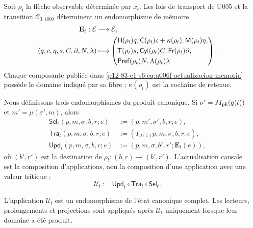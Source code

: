 {Soit \(\rho_t\) la flèche observable déterminée par \(x_t\). Les lois de
transport de U005 et la transition \(\mathcal C_{3,1000}\) déterminent un
endomorphisme de mémoire
\begin{align}
 \mathbf E_t:\mathcal E&\longrightarrow\mathcal E,\notag\\
 (q,c,\eta,s,C,\partial,N,\lambda)&\longmapsto
 \left(
 \begin{aligned}
 &\mathsf H(\rho_t)q,
  \mathsf C(\rho_t)c+\kappa(\rho_t),
  \mathsf M(\rho_t)\eta,\\
 &\mathsf T(\rho_t)s,
  \mathsf{Cyl}(\rho_t)C,
  \mathsf{Fr}(\rho_t)\partial,\\
 &\mathsf{Pref}(\rho_t)N,
  \Lambda(\rho_t)\lambda
 \end{aligned}
 \right).
 \label{p12-83-c1-s6:eq:u006f-actualizacion-memoria}
\end{align}
Chaque composante publiée dans \eqref{p12-83-c1-s6:eq:u006f-actualizacion-memoria} possède le
domaine indiqué par sa fibre ; \(\kappa(\rho_t)\) est la cochaîne de retenue.

Nous définissons trois endomorphismes du produit canonique. Si
\(\sigma'=M_{\rm ph}(g(t))\) et \(m'=\mu(\sigma',m)\), alors
\begin{align}
 \mathsf{Sel}_t(p,m,\sigma,b,r;e)
  &:=(p,m',\sigma',b,r;e),\label{p12-83-c1-s6:eq:u006f-selector-tipado}\\
 \mathsf{Tra}_t(p,m,\sigma,b,r;e)
  &:=(T_{d(t)}p,m,\sigma,b,r;e),\label{p12-83-c1-s6:eq:u006f-transporte-tipado}\\
 \mathsf{Upd}_t(p,m,\sigma,b,r;e)
  &:=(p,m,\sigma,b',r';\mathbf E_t(e)),
 \label{p12-83-c1-s6:eq:u006f-memoria-tipada}
\end{align}
où \((b',r')\) est la destination de \(\rho_t:(b,r)\to(b',r')\). L’actualisation
causale est la composition d’applications, non la composition d’une application avec une valeur
tritique :
\begin{equation}
 \boxed{\mathcal U_t:=
 \mathsf{Upd}_t\circ\mathsf{Tra}_t\circ\mathsf{Sel}_t.}
 \label{p12-83-c1-s6:eq:u006f-tuberia}
\end{equation}

\begin{theorem}
\label{p12-83-c1-s6:thm:u006f-cierre-tuberia}
L’application \(\mathcal U_t\) est un endomorphisme de l’état canonique
complet. Les lecteurs, prolongements et projections sont appliqués après
\(\mathcal U_t\) uniquement lorsque leur domaine a été produit.
\end{theorem}

}
